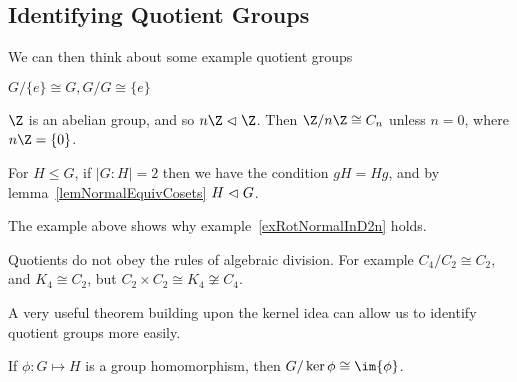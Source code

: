 \documentclass[../Main.tex]{subfiles}
\begin{document}
\subsection{Identifying Quotient Groups}
\begin{examples}{
        We can then think about some example quotient groups
    }
    \item $G / \{e\} \cong G, G / G \cong \{e\}$
    \item $\Z$ is an abelian group, and so $n\Z \normalin \Z$. Then $\Z / n\Z \cong C_n$ unless $n = 0$, where $n\Z = \{0\}$.
    \item For $H \leq G$, if $|G : H| = 2$ then we have the condition $gH = Hg$, and by lemma~\ref{lemNormalEquivCosets} $H \vartriangleleft G$.
    \item The example above shows why example~\ref{exRotNormalInD2n} holds.
    \item Quotients do not obey the rules of algebraic division. For example $C_4 / C_2 \cong C_2$, and $K_4 \cong C_2$, but $C_2 \times C_2 \cong K_4 \not\cong C_4$.
\end{examples}
A very useful theorem building upon the kernel idea can allow us to identify quotient groups more easily.
\begin{theorem}
    If $\phi : G \mapsto H$ is a group homomorphism, then $G / \ker{\phi} \cong \im{\phi}$.
    \label{thmIsomorphism}
\end{theorem}
\end{document}
